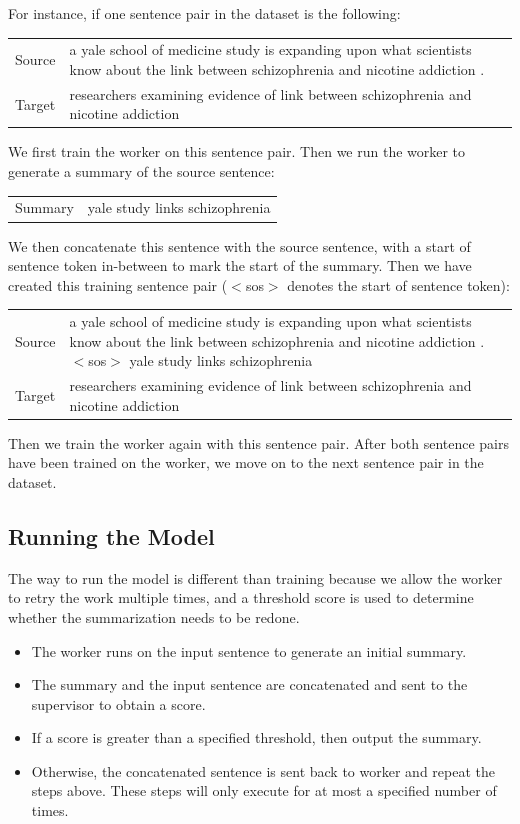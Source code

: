 \documentclass[letterpaper]{article} %
\begin{document}
For instance, if one sentence pair in the dataset is the following:

\begin{center}
	\begin{tabular}{p{40pt} p{170pt}}
		Source & a yale school of medicine study is expanding upon what scientists know about the link between schizophrenia and nicotine addiction . \\
		Target & researchers examining evidence of link between schizophrenia and nicotine addiction
	\end{tabular}
\end{center}

We first train the worker on this sentence pair. Then we run the worker to generate a summary of the source sentence:
\begin{center}
	\begin{tabular}{p{40pt} p{170pt}}
		Summary & yale study links schizophrenia
	\end{tabular}
\end{center}

We then concatenate this sentence with the source sentence, with a start of sentence token in-between to mark the start of the summary. Then we have created this training sentence pair ($<$sos$>$ denotes the start of sentence token):
\begin{center}
	\begin{tabular}{p{40pt} p{170pt}}
		Source & a yale school of medicine study is expanding upon what scientists know about the link between schizophrenia and nicotine addiction . $<$sos$>$ yale study links schizophrenia\\
		Target & researchers examining evidence of link between schizophrenia and nicotine addiction
	\end{tabular}
\end{center}

Then we train the worker again with this sentence pair. After both sentence pairs have been trained on the worker, we move on to the next sentence pair in the dataset.

\subsection{Running the Model}
The way to run the model is different than training because we allow the worker to retry the work multiple times, and a threshold score is used to determine whether the summarization needs to be redone.
\begin{itemize}
	\item The worker runs on the input sentence to generate an initial summary.
	\item The summary and the input sentence are concatenated and sent to the supervisor to obtain a score.
	\item If a score is greater than a specified threshold, then output the summary.
	\item Otherwise, the concatenated sentence is sent back to worker and repeat the steps above. These steps will only execute for at most a specified number of times.
\end{itemize}
\end{document}
